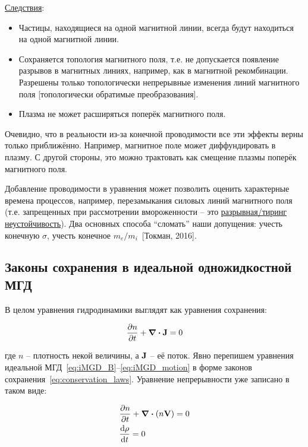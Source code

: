 \documentclass[10pt, a4paper]{article}
\newcommand{\Tokman}{~[Токман, 2016]}
\begin{document}
\uline{Следствия}:

\begin{itemize}
	\item Частицы, находящиеся на одной магнитной линии, всегда будут находиться на одной магнитной линии.
	\item Сохраняется топология магнитного поля, т.е. не допускается появление разрывов в магнитных линиях, например, как в магнитной рекомбинации. Разрешены только топологически непрерывные изменения линий магнитного поля [топологически обратимые преобразования].
	\item Плазма не может расширяться поперёк магнитного поля.
\end{itemize}

Очевидно, что в реальности из-за конечной проводимости все эти эффекты верны только приближённо. Например, магнитное поле может диффундировать в плазму. С другой стороны, это можно трактовать как смещение плазмы поперёк магнитного поля.

Добавление проводимости в уравнения может позволить оценить характерные времена процессов, например, перезамыкания силовых линий магнитного поля (т.е. запрещенных при рассмотрении вмороженности -- это \uline{разрывная/тиринг неустойчивость}). Два основных способа ``сломать'' наши допущения: учесть конечную $\sigma$, учесть конечное $m_e/m_i$\Tokman.

\subsection{Законы сохранения в идеальной одножидкостной МГД}

В целом уравнения гидродинамики выглядят как уравнения сохранения:

\begin{equation}
	\label{eq:conservation_laws}
	\pdv{n}{t} + \div{\vb{J}} = 0
\end{equation}

где $n$ -- плотность некой величины, а $\vb{J}$ -- её поток.
Явно перепишем уравнения идеальной МГД~\eqref{eq:iMGD_B}--\eqref{eq:iMGD_motion} в форме законов сохранения~\eqref{eq:conservation_laws}. Уравнение непрерывности уже записано в таком виде:

\begin{align}
	\label{eq:conservation_laws_1}
	&\pdv{n}{t} + \divergence{\left( n\vb{V} \right)} = 0 \\
	&\dv{\rho}{t} = 0
\end{align}
\end{document}
